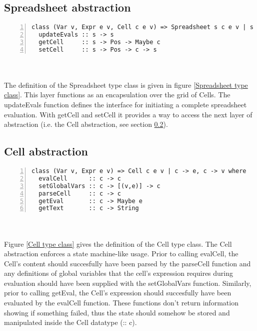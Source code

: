 \documentclass[10pt,a4paper]{article}
\begin{document}
\subsection{Spreadsheet abstraction}
\label{Spreadsheet abstraction}
\begin{minipage}{\linewidth}
\begin{Verbatim}[numbers=left,stepnumber=1,numbersep=5pt]
class (Var v, Expr e v, Cell c e v) => Spreadsheet s c e v | s -> c, s -> v where
  updateEvals :: s -> s
  getCell     :: s -> Pos -> Maybe c
  setCell     :: s -> Pos -> c -> s
\end{Verbatim}
\label{Spreadsheet type class}
\end{minipage}
\\\\
The definition of the Spreadsheet type class is given in figure \ref{Spreadsheet type class}.
This layer functions as an encapsulation over the grid of Cells. The updateEvals function
defines the interface for initiating a complete spreadsheet evaluation.
With getCell and setCell it provides a way to access the next layer of abstraction (i.e. the
Cell abstraction, see section \ref{Cell abstraction}).

\subsection{Cell abstraction}
\label{Cell abstraction}
\begin{minipage}{\linewidth}
\begin{Verbatim}[numbers=left,stepnumber=1,numbersep=5pt]
class (Var v, Expr e v) => Cell c e v | c -> e, c -> v where
  evalCell      :: c -> c
  setGlobalVars :: c -> [(v,e)] -> c
  parseCell     :: c -> c
  getEval       :: c -> Maybe e
  getText       :: c -> String
\end{Verbatim}
\label{Cell type class}
\end{minipage}
\\\\
Figure \ref{Cell type class} gives the definition of the Cell type class.
The Cell abstraction enforces a state machine-like usage. Prior to calling evalCell, the Cell's
content should succesfully have been parsed by the parseCell function and any definitions of
global variables that the cell's expression requires during evaluation should have been supplied
with the setGlobalVars function. Similarly, prior to calling getEval, the Cell's expression should
succesfully have been evaluated by the evalCell function. These functions don't return information
showing if something failed, thus the state should somehow be stored and manipulated inside the
Cell datatype (:: c).
\end{document}
